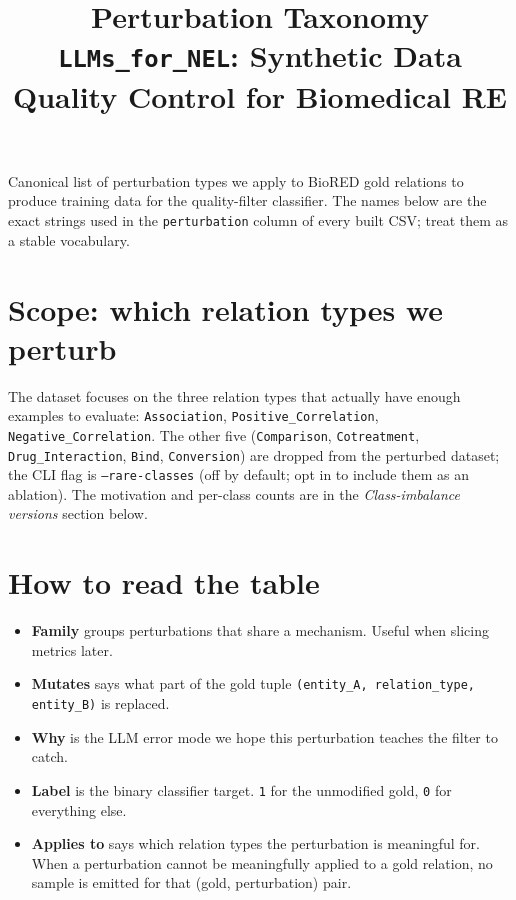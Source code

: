 \documentclass[11pt,a4paper]{article}
\title{Perturbation Taxonomy\\[0.3em]
\large \texttt{LLMs\_for\_NEL}: Synthetic Data Quality Control for Biomedical RE}
\author{}
\date{}
\newcommand{\code}[1]{\texttt{#1}}
\begin{document}
\maketitle
\vspace{-3em}

\noindent
Canonical list of perturbation types we apply to BioRED gold relations to produce training data for the quality-filter classifier. The names below are the exact strings used in the \code{perturbation} column of every built CSV; treat them as a stable vocabulary.

\section*{Scope: which relation types we perturb}

The dataset focuses on the three relation types that actually have enough examples to evaluate: \code{Association}, \code{Positive\_Correlation}, \code{Negative\_Correlation}. The other five (\code{Comparison}, \code{Cotreatment}, \code{Drug\_Interaction}, \code{Bind}, \code{Conversion}) are dropped from the perturbed dataset; the CLI flag is \code{--rare-classes} (off by default; opt in to include them as an ablation). The motivation and per-class counts are in the \emph{Class-imbalance versions} section below.

\section*{How to read the table}

\begin{itemize}
\item \textbf{Family} groups perturbations that share a mechanism. Useful when slicing metrics later.
\item \textbf{Mutates} says what part of the gold tuple \code{(entity\_A, relation\_type, entity\_B)} is replaced.
\item \textbf{Why} is the LLM error mode we hope this perturbation teaches the filter to catch.
\item \textbf{Label} is the binary classifier target. \code{1} for the unmodified gold, \code{0} for everything else.
\item \textbf{Applies to} says which relation types the perturbation is meaningful for. When a perturbation cannot be meaningfully applied to a gold relation, no sample is emitted for that (gold, perturbation) pair.
\end{itemize}
\end{document}
